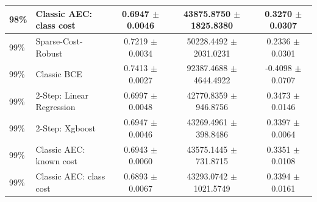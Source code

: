 \begin{tabular}{l l c c c}
98\%  & Classic AEC: class cost & 0.6947 $\pm$ 0.0046 & 43875.8750 $\pm$ 1825.8380 & 0.3270 $\pm$ 0.0307 \\
\midrule
99\%  & Sparse-Cost-Robust & 0.7219 $\pm$ 0.0034 & 50228.4492 $\pm$ 2031.0231 & 0.2336 $\pm$ 0.0301 \\
99\%  & Classic BCE & 0.7413 $\pm$ 0.0027 & 92387.4688 $\pm$ 4644.4922 & -0.4098 $\pm$ 0.0707 \\
99\%  & 2-Step: Linear Regression & 0.6997 $\pm$ 0.0048 & 42770.8359 $\pm$ 946.8756 & 0.3473 $\pm$ 0.0146 \\
99\%  & 2-Step: Xgboost & 0.6947 $\pm$ 0.0046 & 43269.4961 $\pm$ 398.8486 & 0.3397 $\pm$ 0.0064 \\
99\%  & Classic AEC: known cost & 0.6943 $\pm$ 0.0060 & 43575.1445 $\pm$ 731.8715 & 0.3351 $\pm$ 0.0108 \\
99\%  & Classic AEC: class cost & 0.6893 $\pm$ 0.0067 & 43293.0742 $\pm$ 1021.5749 & 0.3394 $\pm$ 0.0161 \\
\bottomrule
\end{tabular}
